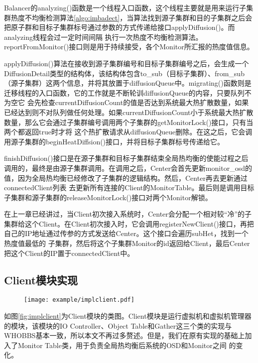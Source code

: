 Balancer的analyzing()函数是一个线程入口函数，这个线程主要就是用来运行子集群热度不均衡检测算法\ref{algo:imbadect}，当算法找到源子集群和目的子集群之后会把原子群和目标子集群标号通过参数的方式传递给接口applyDiffusion()。而analyzing线程会过一定时间间隔
执行一次热度不均衡检测算法。reportFromMonitor()接口则是用于持续接受，各个Monitor所汇报的热度值信息。

applyDiffusion()算法在接收到源子集群编号和目标子集群编号之后，会生成一个DiffusionDetail类型的结构体，该结构体包含to\_sub（目标子集群）、from\_sub（源子集群）这两个信息，并将其放置于diffusionQueue中。migrating()函数则是迁移线程的入口函数，它的工作就是不断轮训diffusionQueue的内容，只要队列不为空它
会先检查currentDiffusionCount的值是否达到系统最大热扩散数量，如果已经达到则不对队列做任何处理。如果currentDiffusionCount小于系统最大热扩散数量，那么它会通过子集群编号调用两个子集群的getMonitorLock()接口，只有当两个都返回true时才将
这个热扩散请求从diffusionQueue删除。在这之后，它会调用源子集群的beginHeatDiffsion()接口，并将目标子集群标号传递给它。

finishDiffusion()接口是在源子集群和目标子集群结束全局热均衡的使能过程之后调用的，最终是由源子集群调用。在调用之后，Center会首先更新monitor\_osd的值，因为全局热均衡已经修改了子集群的逻辑结构。然后，Center再去更新通过connectedClient列表
去更新所有连接的Client的MonitorTable。最后则是调用目标子集群和源子集群的releaseMonitorLock()接口对两个Monitor解锁。

在上一章已经讲过，当Client初次接入系统时，Center会分配一个相对较“冷”的子集群给这个Client。在Client初次接入时，它会调用registerNewClient()接口，再把自己的IP地址通过传参的方式发送给Center。这个接口会遍历subHet，找到一个热度值最低的
子集群，然后将这个子集群Monitor的id返回给Client，最后Center把这个Client的IP置于connectedClient中。

\subsection{Client模块实现}
\begin{figure}[!htp]
    \centering
    \texttt{[image: example/implclient.pdf]}
\end{figure}

如图\ref{fig:implclient}为Client模块的类图。Client模块是运行虚拟机和虚拟机管理器的模块，该模块的IO Controller、Object Table和Gather这三个类的实现与WHOBBS基本一致，所以本文不再过多赘述。但是，我们在原有实现的基础上加入了Monitor Table类，用于负责全局热均衡后系统的OSD和Monitor之间
的变化。

